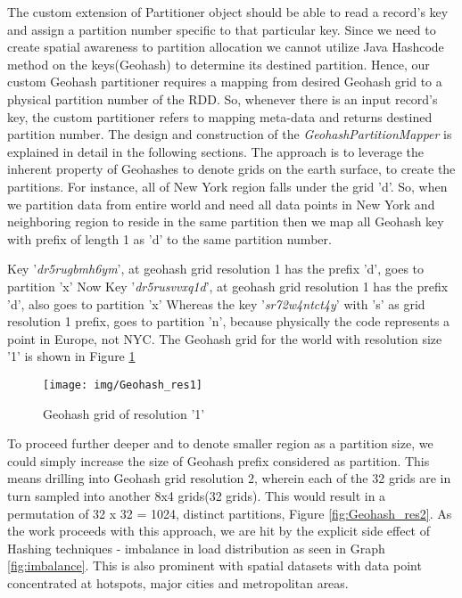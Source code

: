 \documentclass[article,type=msc,colorback,12pt,accentcolor=tud1d]{tudthesis}
\begin{document}
		\par The custom extension of Partitioner object should be able to read a record's key and assign a partition number specific to that particular key. Since we need to create spatial awareness to partition allocation we cannot utilize Java Hashcode method on the keys(Geohash) to determine its destined partition. Hence, our custom Geohash partitioner requires a mapping from desired Geohash grid to a physical partition number of the RDD. So, whenever there is an input record's key, the custom partitioner refers to mapping meta-data and returns destined partition number. The design and construction of the \textit{GeohashPartitionMapper} is explained in detail in the following sections.
		The approach is to leverage the inherent property of Geohashes to denote grids on the earth surface, to create the partitions. For instance, all of New York region falls under the grid 'd'. So, when we partition data from entire world and need all data points in New York and neighboring region to reside in the same partition then we map all Geohash key with prefix of length 1 as 'd' to the same partition number.  
		
		Key '\textit{dr5rugbmh6ym}', at geohash grid resolution 1 has the prefix 'd', goes to partition 'x'
		Now Key '\textit{dr5rusvvxq1d}', at geohash grid resolution 1 has the prefix 'd', also goes to partition 'x'
		Whereas the key '\textit{sr72w4ntct4y}' with 's' as grid resolution 1 prefix, goes to partition 'n', because physically the code represents a point in Europe, not NYC. The Geohash grid for the world with resolution size '1' is shown in Figure \ref{fig:Geohash_res1}
							
			\begin{figure}[h]
			\centering
			\texttt{[image: img/Geohash\_res1]}
			\caption{Geohash grid of resolution '1'}
			\label{fig:Geohash_res1}
			\end{figure}
		
		To proceed further deeper and to denote smaller region as a partition size, we could simply increase the size of Geohash prefix considered as partition. This means drilling into Geohash grid resolution 2, wherein each of the 32 grids are in turn  sampled into another 8x4 grids(32 grids). This would result in a permutation of 32 x 32 = 1024, distinct partitions, Figure \ref{fig:Geohash_res2}. As the work proceeds with this approach, we are hit by the explicit side effect of Hashing techniques - imbalance in load distribution as seen in Graph \ref{fig:imbalance}. This is also prominent with spatial datasets with data point concentrated at hotspots, major cities and metropolitan areas. 
		
\end{document}
